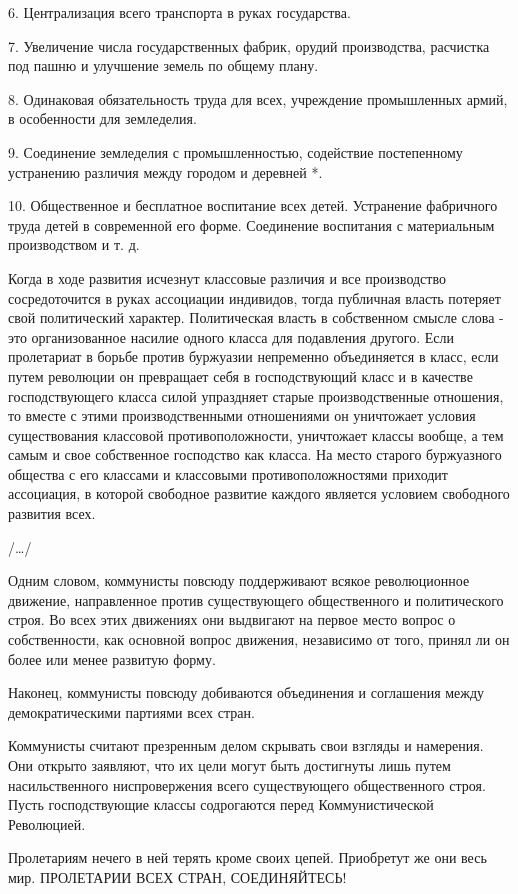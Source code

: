 \documentclass[12pt]{article}
\newcommand{\parnum}{(\arabic{parcount})}
\newcounter{parcount}
\newenvironment{parnumbers}{%
  \par%
  \everypar{\noindent \stepcounter{parcount}\marginpar[]{\parnum}}%
}{}
\begin{document}
6. Централизация всего транспорта в руках государства.

7. Увеличение числа государственных фабрик, орудий производства, расчистка под пашню и улучшение земель по общему плану.

8. Одинаковая обязательность труда для всех, учреждение промышленных армий, в особенности для земледелия.

9. Соединение земледелия с промышленностью, содействие постепенному устранению различия между городом и деревней *.

10. Общественное и бесплатное воспитание всех детей. Устранение фабричного труда детей в современной его форме. Соединение воспитания с материальным производством и т. д.

\begin{parnumbers}
Когда в ходе развития исчезнут классовые различия и все производство сосредоточится в руках ассоциации индивидов, тогда публичная власть потеряет свой политический характер. Политическая власть в собственном смысле слова - это организованное насилие одного класса для подавления другого. Если пролетариат в борьбе против буржуазии непременно объединяется в класс, если путем революции он превращает себя в господствующий класс и в качестве господствующего класса силой упраздняет старые производственные отношения, то вместе с этими производственными отношениями он уничтожает условия существования классовой противоположности, уничтожает классы вообще, а тем самым и свое собственное господство как класса. На место старого буржуазного общества с его классами и классовыми противоположностями приходит ассоциация, в которой свободное развитие каждого является условием свободного развития всех.
\end{parnumbers}

/…/

\begin{parnumbers}
Одним словом, коммунисты повсюду поддерживают всякое революционное движение, направленное против существующего общественного и политического строя. Во всех этих движениях они выдвигают на первое место вопрос о собственности, как основной вопрос движения, независимо от того, принял ли он более или менее развитую форму.

Наконец, коммунисты повсюду добиваются объединения и соглашения между демократическими партиями всех стран.

Коммунисты считают презренным делом скрывать свои взгляды и намерения. Они открыто заявляют, что их цели могут быть достигнуты лишь путем насильственного ниспровержения всего существующего общественного строя. Пусть господствующие классы содрогаются перед Коммунистической Революцией.

Пролетариям нечего в ней терять кроме своих цепей. Приобретут же они весь мир. ПРОЛЕТАРИИ ВСЕХ СТРАН, СОЕДИНЯЙТЕСЬ!
\end{parnumbers}
\end{document}
